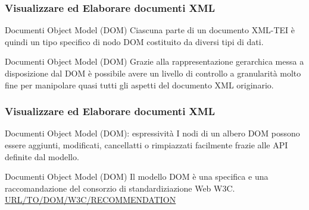 \begin{frame}
    \frametitle{Visualizzare ed Elaborare documenti XML}
    \addtocounter{nframe}{1}
    

     \begin{block}{Documenti Object Model (DOM)}
        Ciascuna parte di un documento XML-TEI è quindi un tipo specifico di nodo DOM costituito da diversi tipi di dati.
     \end{block}

     \begin{block}{Documenti Object Model (DOM)}
        Grazie alla rappresentazione gerarchica messa a disposizione dal DOM è possibile avere un livello di controllo a granularità molto fine per manipolare quasi tutti gli aspetti del documento XML originario.
     \end{block}
     
\end{frame}

\begin{frame}
    \frametitle{Visualizzare ed Elaborare documenti XML}
    \addtocounter{nframe}{1}
    

     \begin{block}{Documenti Object Model (DOM): espressività}
       I nodi di un albero DOM possono essere aggiunti, modificati, cancellatti o rimpiazzati facilmente frazie alle API definite dal modello.
     \end{block}

     \begin{block}{Documenti Object Model (DOM)}
        Il modello DOM è una specifica e una raccomandazione del consorzio di standardiziazione Web W3C.
        \\\url{URL/TO/DOM/W3C/RECOMMENDATION}
     \end{block}
     
\end{frame}

